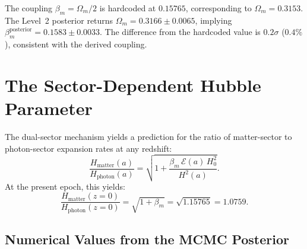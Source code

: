 \documentclass[11pt]{article}
\begin{document}
The coupling $\beta_m = \Omega_m/2$ is hardcoded at $0.15765$,
corresponding to $\Omega_m = 0.3153$.  The Level~2 posterior returns
$\Omega_m = 0.3166 \pm 0.0065$, implying
$\beta_m^\mathrm{posterior} = 0.1583 \pm 0.0033$.  The difference from
the hardcoded value is $0.2\sigma$ ($0.4\%$), consistent with the
derived coupling.


\section{The Sector-Dependent Hubble Parameter}
\label{sec:hubble}

The dual-sector mechanism yields a prediction
for the ratio of matter-sector to photon-sector expansion rates at any
redshift:
\begin{equation}
\frac{H_\mathrm{matter}(a)}{H_\mathrm{photon}(a)}
= \sqrt{1 + \frac{\beta_m\,\mathcal{E}(a)\,H_0^2}{H^2(a)}}.
\label{eq:hubble_ratio}
\end{equation}
At the present epoch, this yields:
\begin{equation}
\frac{H_\mathrm{matter}(z{=}0)}{H_\mathrm{photon}(z{=}0)}
= \sqrt{1 + \beta_m} = \sqrt{1.15765} = 1.0759.
\label{eq:hubble_ratio_today}
\end{equation}

\subsection{Numerical Values from the MCMC Posterior}
\end{document}
